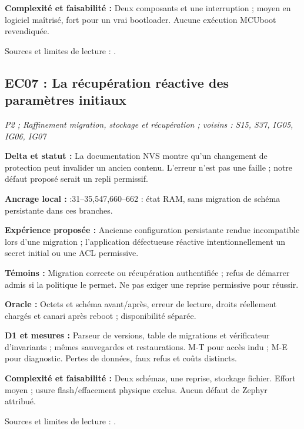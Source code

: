 \documentclass[11pt,a4paper]{article}
\newcommand{\code}[1]{{\small\ttfamily\path{#1}}}
\begin{document}
\textbf{Complexité et faisabilité :} Deux composants et une interruption ; moyen en logiciel maîtrisé, fort pour un vrai bootloader. Aucune exécution MCUboot revendiquée.

Sources et limites de lecture : \cite{mcuboot}.

\par\noindent\begin{minipage}{\linewidth}\setlength{\parskip}{5pt}\subsection{EC07 : La récupération réactive des paramètres initiaux}

\textit{P2 ; Raffinement migration, stockage et récupération ; voisins : S15, S37, IG05, IG06, IG07}

\textbf{Delta et statut :} La documentation NVS montre qu'un changement de protection peut invalider un ancien contenu. L'erreur n'est pas une faille ; notre défaut proposé serait un repli permissif.\par\end{minipage}\par

{\small\textbf{Ancrage local :} \code{benchmark_simulator.py}:31--35,547,660--662 : état RAM, sans migration de schéma persistante dans ces branches.}

\textbf{Expérience proposée :} Ancienne configuration persistante rendue incompatible lors d'une migration ; l'application défectueuse réactive intentionnellement un secret initial ou une ACL permissive.

\textbf{Témoins :} Migration correcte ou récupération authentifiée ; refus de démarrer admis si la politique le permet. Ne pas exiger une reprise permissive pour réussir.

\textbf{Oracle :} Octets et schéma avant/après, erreur de lecture, droits réellement chargés et canari après reboot ; disponibilité séparée.

\textbf{D1 et mesures :} Parseur de versions, table de migrations et vérificateur d'invariants ; mêmes sauvegardes et restaurations. M-T pour accès indu ; M-E pour diagnostic. Pertes de données, faux refus et coûts distincts.

\textbf{Complexité et faisabilité :} Deux schémas, une reprise, stockage fichier. Effort moyen ; usure flash/effacement physique exclus. Aucun défaut de Zephyr attribué.

Sources et limites de lecture : \cite{nvs}.
\end{document}
